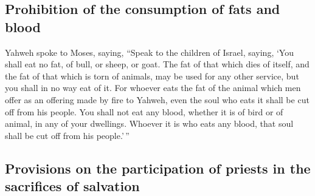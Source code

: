 \hypertarget{prohibition-of-the-consumption-of-fats-and-blood}{%
\subsection{Prohibition of the consumption of fats and
blood}\label{prohibition-of-the-consumption-of-fats-and-blood}}

 Yahweh spoke to Moses, saying,  ``Speak
to the children of Israel, saying, `You shall eat no fat, of bull, or
sheep, or goat.  The fat of that which dies of itself,
and the fat of that which is torn of animals, may be used for any other
service, but you shall in no way eat of it.  For whoever
eats the fat of the animal which men offer as an offering made by fire
to Yahweh, even the soul who eats it shall be cut off from his people.
 You shall not eat any blood, whether it is of bird or of
animal, in any of your dwellings.  Whoever it is who eats
any blood, that soul shall be cut off from his people.'\,''

\hypertarget{provisions-on-the-participation-of-priests-in-the-sacrifices-of-salvation}{%
\subsection{Provisions on the participation of priests in the sacrifices
of
salvation}\label{provisions-on-the-participation-of-priests-in-the-sacrifices-of-salvation}}

